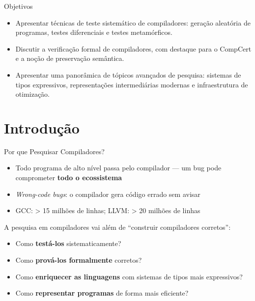 \subtitle{\bf Aula 23 - Introdução}
\begin{frame}[t,plain]
    \titlepage
\end{frame}

\begin{frame}{Objetivos}

    \begin{itemize}
        \item
        Apresentar técnicas de teste sistemático de compiladores: geração
        aleatória de programas, testes diferenciais e testes metamórficos.
        \item
        Discutir a verificação formal de compiladores, com destaque para o
        CompCert e a noção de preservação semântica.
        \item
        Apresentar uma panorâmica de tópicos avançados de pesquisa: sistemas
        de tipos expressivos, representações intermediárias modernas e
        infraestrutura de otimização.
    \end{itemize}
\end{frame}


\section{Introdução}\label{introduuxe7uxe3o}

\begin{frame}{Por que Pesquisar Compiladores?}

    \begin{itemize}

        \item
        Todo programa de alto nível passa pelo compilador --- um bug pode
        comprometer \textbf{todo o ecossistema}
        \item
        \emph{Wrong-code bugs}: o compilador gera código errado sem avisar
        \item
        GCC: \textgreater{} 15 milhões de linhas; LLVM: \textgreater{} 20
        milhões de linhas
    \end{itemize}

    A pesquisa em compiladores vai além de ``construir compiladores
    corretos'':

    \begin{itemize}

        \item
        Como \textbf{testá-los} sistematicamente?
        \item
        Como \textbf{prová-los formalmente} corretos?
        \item
        Como \textbf{enriquecer as linguagens} com sistemas de tipos mais
        expressivos?
        \item
        Como \textbf{representar programas} de forma mais eficiente?
    \end{itemize}
\end{frame}

